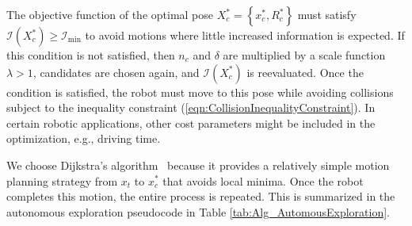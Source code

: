 \documentclass[letterpaper, 10pt, conference]{ieeeconf}
\newcommand{\norm}[1]{\ensuremath{\left\| #1 \right\|}}
\newcommand{\braces}[1]{\ensuremath{\left\{ #1 \right\}}}
\newcommand{\refeqn}[1]{(\ref{eqn:#1})}
\renewcommand{\Re}{\ensuremath{\mathbb{R}}}
\begin{document}
%
%
%

The objective function of the optimal pose $X_c^*=\braces{x_c^*,R_c^*}$ must satisfy $\mathcal I(X_c^*)\geq\mathcal I_\text{min}$ to avoid motions where little increased information is expected. 
If this condition is not satisfied, then $n_c$ and $\delta$ are multiplied by a scale function $\lambda>1$, candidates are chosen again, and $\mathcal I(X_c^*)$ is reevaluated.
Once the condition is satisfied, the robot must move to this pose while avoiding collisions subject to the inequality constraint \refeqn{CollisionInequalityConstraint}. In certain robotic applications, other cost parameters might be included in the optimization, e.g., driving time.

We choose Dijkstra's algorithm~\cite{Dij59} because it provides a relatively simple motion planning strategy from $x_t$ to $x_c^*$ that avoids local minima. Once the robot completes this motion, the entire process is repeated. This is summarized in the autonomous exploration pseudocode in Table \ref{tab:Alg_AutomousExploration}.


\end{document}
